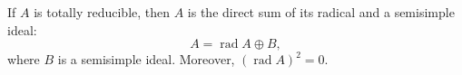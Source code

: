 If $A$ is totally reducible, then $A$ is the direct sum of its radical and a semisimple ideal:
$$
A = \operatorname{rad} A \oplus B,
$$
where $B$ is a semisimple ideal. Moreover, $(\operatorname{rad} A)^2 = 0$.
